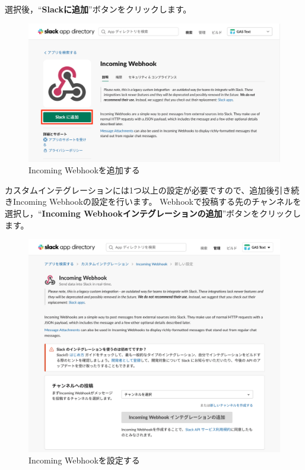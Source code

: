 \documentclass[uplatex,a4j]{jsarticle}
\begin{document}
選択後，``\textbf{Slackに追加}''ボタンをクリックします。

\begin{figure}[H]
 \centering
 \includegraphics[keepaspectratio, scale=0.4]{images/add_incoming_webhook.png}
 \caption{Incoming Webhookを追加する}
 \label{fig:add_incoming_webhook}
\end{figure}

カスタムインテグレーションには1つ以上の設定が必要ですので、追加後引き続きIncoming Webhookの設定を行います。
Webhookで投稿する先のチャンネルを選択し，``\textbf{Incoming Webhookインテグレーションの追加}''ボタンをクリックします。

\begin{figure}[H]
 \centering
 \includegraphics[keepaspectratio, scale=0.4]{images/configure_incoming_webhook.png}
 \caption{Incoming Webhookを設定する}
\end{figure}
\end{document}
